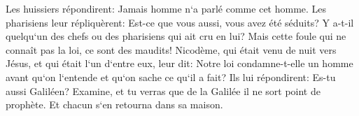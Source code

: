 \verse Les huissiers répondirent: Jamais homme n`a parlé comme cet homme. 
\verse Les pharisiens leur répliquèrent: Est-ce que vous aussi, vous avez été séduits? 
\verse Y a-t-il quelqu`un des chefs ou des pharisiens qui ait cru en lui? 
\verse Mais cette foule qui ne connaît pas la loi, ce sont des maudits! 
\verse Nicodème, qui était venu de nuit vers Jésus, et qui était l`un d`entre eux, leur dit: 
\verse Notre loi condamne-t-elle un homme avant qu`on l`entende et qu`on sache ce qu`il a fait? 
\verse Ils lui répondirent: Es-tu aussi Galiléen? Examine, et tu verras que de la Galilée il ne sort point de prophète. 
\verse Et chacun s`en retourna dans sa maison. 

\chapter{}

